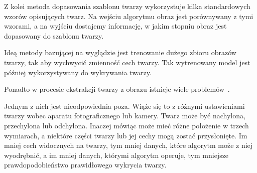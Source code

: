 \documentclass[a4paper,twoside,12pt]{book}
\begin{document}
    Z kolei metoda dopasowania szablonu twarzy wykorzystuje kilka standardowych wzorów opisujących twarz.
    Na wejściu algorytmu obraz jest porównywany z tymi wzorami, a
    na wyjściu dostajemy informację, w jakim stopniu obraz jest dopasowany do szablonu twarzy.

    Ideą metody bazującej na wyglądzie jest trenowanie dużego zbioru obrazów twarzy, tak aby wychwycić zmienność cech
    twarzy.
    Tak wytrenowany model jest później wykorzystywany do wykrywania twarzy.


    Ponadto w procesie ekstrakcji twarzy z obrazu istnieje wiele problemów~\cite{mehdiRizvi}.

    Jednym z nich jest nieodpowiednia poza.
    Wiąże się to z różnymi ustawieniami twarzy wobec aparatu fotograficznego lub kamery.
    Twarz może być nachylona, przechylona lub odchylona.
    Inaczej mówiąc może mieć różne położenie w trzech wymiarach, a
    niektóre części twarzy lub jej cechy mogą zostać przysłonięte.
    Im mniej cech widocznych na twarzy, tym mniej danych, które algorytm może z niej wyodrębnić, a
    im mniej danych, którymi algorytm operuje, tym mniejsze prawdopodobieństwo prawidłowego wykrycia twarzy.
\end{document}
